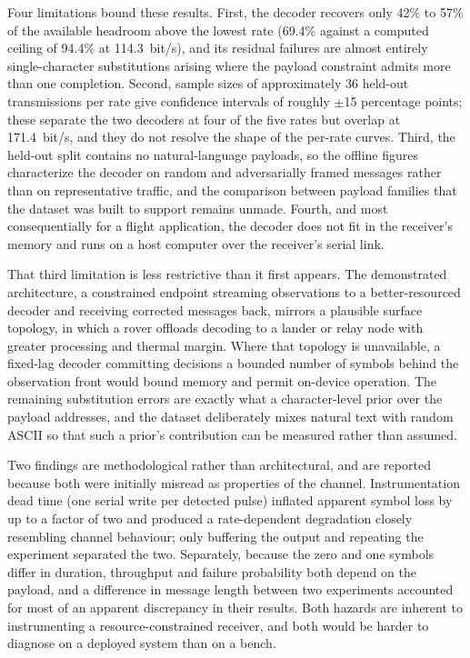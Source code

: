 Four limitations bound these results. First, the decoder recovers only 42\% to
57\% of the available headroom above the lowest rate (69.4\% against a computed
ceiling of 94.4\% at 114.3~bit/s), and its residual failures are almost
entirely single-character substitutions arising where the payload constraint
admits more than one completion. Second, sample sizes of approximately 36
held-out transmissions per rate give confidence intervals of roughly $\pm$15
percentage points; these separate the two decoders at four of the five rates but
overlap at 171.4~bit/s, and they do not resolve the shape of the per-rate
curves. Third, the held-out split contains no natural-language payloads, so the
offline figures characterize the decoder on random and adversarially framed
messages rather than on representative traffic, and the comparison between
payload families that the dataset was built to support remains unmade. Fourth,
and most consequentially for a flight application, the decoder does not fit in
the receiver's memory and runs on a host computer over the receiver's serial
link.

That third limitation is less restrictive than it first appears. The
demonstrated architecture, a constrained endpoint streaming observations to a
better-resourced decoder and receiving corrected messages back, mirrors a
plausible surface topology, in which a rover offloads decoding to a lander or
relay node with greater processing and thermal margin. Where that topology is
unavailable, a fixed-lag decoder committing decisions a bounded number of
symbols behind the observation front would bound memory and permit on-device
operation. The remaining substitution errors are exactly what a character-level
prior over the payload addresses, and the dataset deliberately mixes natural
text with random ASCII so that such a prior's contribution can be measured
rather than assumed.

Two findings are methodological rather than architectural, and are reported
because both were initially misread as properties of the channel.
Instrumentation dead time (one serial write per detected pulse) inflated
apparent symbol loss by up to a factor of two and produced
a rate-dependent degradation closely resembling channel behaviour; only
buffering the output and repeating the experiment separated the two. Separately,
because the zero and one symbols differ in duration, throughput and failure
probability both depend on the payload, and a difference in message length
between two experiments accounted for most of an apparent discrepancy in their
results. Both hazards are inherent to instrumenting a resource-constrained
receiver, and both would be harder to diagnose on a deployed system than on a
bench.

